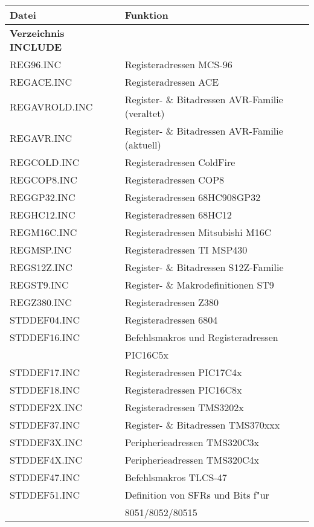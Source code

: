 \documentclass[12pt,a4paper,twoside]{report}
\begin{document}
\begin{table*}[htp]
\begin{center}\begin{tabular}{|l|l|}
\hline
Datei             & Funktion \\
\hline
\hline
{\bf Verzeichnis INCLUDE} & \\
\hline
REG96.INC         & Registeradressen MCS-96 \\
REGACE.INC        & Registeradressen ACE \\
REGAVROLD.INC     & Register- \& Bitadressen AVR-Familie (veraltet)\\
REGAVR.INC        & Register- \& Bitadressen AVR-Familie (aktuell)\\
REGCOLD.INC       & Registeradressen ColdFire \\
REGCOP8.INC       & Registeradressen COP8 \\
REGGP32.INC       & Registeradressen 68HC908GP32 \\
REGHC12.INC       & Registeradressen 68HC12 \\
REGM16C.INC       & Registeradressen Mitsubishi M16C \\
REGMSP.INC        & Registeradressen TI MSP430 \\
REGS12Z.INC       & Register- \& Bitadressen S12Z-Familie \\
REGST9.INC        & Register- \& Makrodefinitionen ST9 \\
REGZ380.INC       & Registeradressen Z380 \\
STDDEF04.INC      & Registeradressen 6804 \\
STDDEF16.INC      & Befehlsmakros und Registeradressen \\
                  & PIC16C5x \\
STDDEF17.INC      & Registeradressen PIC17C4x \\
STDDEF18.INC      & Registeradressen PIC16C8x \\
STDDEF2X.INC      & Registeradressen TMS3202x \\
STDDEF37.INC      & Register- \& Bitadressen TMS370xxx \\
STDDEF3X.INC      & Peripherieadressen TMS320C3x \\
STDDEF4X.INC      & Peripherieadressen TMS320C4x \\
STDDEF47.INC      & Befehlsmakros TLCS-47 \\
STDDEF51.INC      & Definition von SFRs und Bits f"ur \\
                  & 8051/8052/80515 \\

\end{tabular}
\end{center}
\end{table*}
\end{document}

